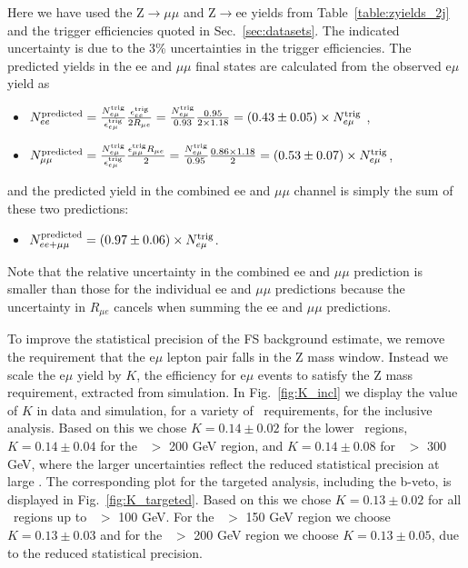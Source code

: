 Here we have used the Z$\to\mu\mu$ and Z$\to$ee yields from Table~\ref{table:zyields_2j} and the trigger efficiencies quoted in Sec.~\ref{sec:datasets}.
The indicated uncertainty is due to the 3\% uncertainties in the trigger efficiencies. %
The predicted yields in the ee and $\mu\mu$ final states are calculated from the observed e$\mu$ yield as

\begin{itemize}
\item $N_{ee}^{\rm{predicted}}    = \frac {N_{e\mu}^{\rm{trig}}} {\epsilon_{e\mu}^{\rm{trig}}} \frac {\epsilon_{ee}^{\rm{trig}}} {2 R_{\mu e}} 
= \frac{N_{e\mu}^{\rm{trig}}}{0.93}\frac{0.95}{2\times1.18} = (0.43\pm0.05) \times N_{e\mu}^{\rm{trig}}$ ,
\item $N_{\mu\mu}^{\rm{predicted}} = \frac {N_{e\mu}^{\rm{trig}}} {\epsilon_{e\mu}^{\rm{trig}}} \frac {\epsilon_{\mu\mu}^{\rm{trig}} R_{\mu e}}  {2}
= \frac {N_{e\mu}^{\rm{trig}}} {0.95} \frac {0.86 \times 1.18}{2} = (0.53\pm0.07) \times N_{e\mu}^{\rm{trig}}$,
\end{itemize}

and the predicted yield in the combined ee and $\mu\mu$ channel is simply the sum of these two predictions:

\begin{itemize}
\item $N_{ee+\mu\mu}^{\rm{predicted}} = (0.97\pm0.06)\times N_{e\mu}^{\rm{trig}}$.
\end{itemize}

Note that the relative uncertainty in the combined ee and $\mu\mu$ prediction is smaller than those for the individual ee and $\mu\mu$ predictions
because the uncertainty in $R_{\mu e}$ cancels when summing the ee and $\mu\mu$ predictions. %

To improve the statistical precision of the FS background estimate, we remove the requirement that the e$\mu$ lepton pair falls in the Z mass window.
Instead we scale the e$\mu$ yield by $K$, the efficiency for e$\mu$ events to satisfy the Z mass requirement, extracted from simulation. In Fig.~\ref{fig:K_incl}
we display the value of $K$ in data and simulation, for a variety of \MET\ requirements, for the inclusive analysis. 
Based on this we chose $K=0.14\pm0.02$ for the lower \MET\ regions, $K=0.14\pm0.04$ for the \MET\ $>$ 200 GeV region, and $K=0.14\pm0.08$ for \MET\ $>$ 300 GeV,
where the larger uncertainties reflect the reduced statistical precision at large \MET.
The corresponding plot for the targeted analysis, including the b-veto, is displayed in Fig.~\ref{fig:K_targeted}.
Based on this we chose $K=0.13\pm0.02$ for all \MET\ regions up to  \MET\ $>$ 100 GeV. 
For the \MET\ $>$ 150 GeV region we choose $K=0.13\pm0.03$
and for the \MET\ $>$ 200 GeV region we choose $K=0.13\pm0.05$, 
due to the reduced  statistical precision.

